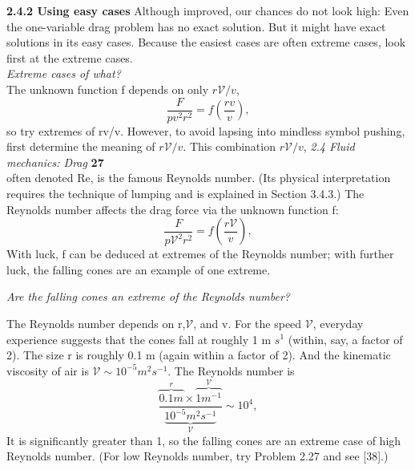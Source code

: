 \documentclass[a4paper, 12pt]{book}
\begin{document}
\textbf {2.4.2 Using easy cases}
Although improved, our chances do not look high: Even the one-variable
drag problem has no exact solution. But it might have exact solutions in
its easy cases. Because the easiest cases are often extreme cases, look first
at the extreme cases.\\

\textit{Extreme cases of what?}\\

The unknown function f depends on only $r\mathcal{V}/v$,
\begin{equation}\frac{F}{pv^2r^2}=f\left(\frac{rv}{v}\right),\end{equation}
so try extremes of rv/v. However, to avoid lapsing into mindless symbol
pushing, first determine the meaning of $r\mathcal{V}/v$. This combination $r\mathcal{V}/v$,
\large\textit{2.4 Fluid mechanics: Drag} \hfill \textbf{27} \\

often denoted Re, is the famous Reynolds number. (Its physical interpretation
requires the technique of lumping and is explained in Section 3.4.3.)
The Reynolds number affects the drag force via the unknown function f:
\begin{equation}\frac{F}{p\mathcal{V}^2r^2}=f\left(\frac{r\mathcal{V}}{v}\right),\end{equation}
With luck, f can be deduced at extremes of the Reynolds number; with
further luck, the falling cones are an example of one extreme.

\textit{Are the falling cones an extreme of the Reynolds number?}

The Reynolds number depends on r,$\mathcal{V}$, and v. For the speed $\mathcal{V}$, everyday
experience suggests that the cones fall at roughly 1 m $s^1$ (within, say, a
factor of 2). The size r is roughly 0.1 m (again within a factor of 2). And
the kinematic viscosity of air is $\mathcal{V}\sim 10^{−5}m^{2}s^{−1}$. The Reynolds number is
\begin{equation}\frac{\overbrace{0.1m}^r\times \overbrace{1m^{-1}}^\mathcal{V}}{\underbrace{10^{−5}m^{2}s^{−1}}_\mathcal{V}}\sim 10^4,\end{equation}
It is significantly greater than 1, so the falling cones are an extreme case of high Reynolds number. (For low Reynolds number, try Problem 2.27 and see [38].)
\end{document}
